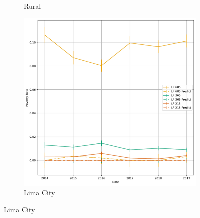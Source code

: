 \begin{figure}[H]
\begin{subfigure}[b]{0.47\textwidth}
            \caption{Rural}
         \end{subfigure} 
         \hfill
         \begin{subfigure}[b]{0.47\textwidth}
            \centering
            \includegraphics[width=\textwidth]{../figures/fig8c_poverty_rate_time_series_lima.pdf}        
            \caption{Lima City}
         \end{subfigure} 
\end{figure}



